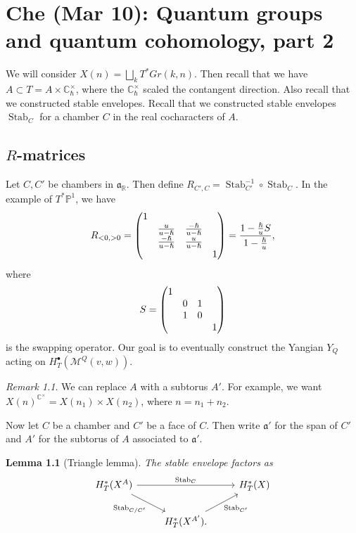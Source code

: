 \documentclass[leqno, openany]{memoir}
\newtheorem{lem}[thm]{Lemma}
\theoremstyle{definition}
\theoremstyle{remark}
\newtheorem{rmk}[thm]{Remark}
\theoremstyle{plain}
\theoremstyle{definition}
\theoremstyle{remark}
\newcommand{\R}{\mathbb{R}}
\newcommand{\C}{\mathbb{C}}
\renewcommand{\P}{\mathbb{P}}
\newcommand{\mc}[1]{\mathcal{#1}}
\newcommand{\mf}[1]{\mathfrak{#1}}
\newcommand{\on}[1]{\operatorname{#1}}
\begin{document}
\chapter{Che (Mar 10): Quantum groups and quantum cohomology, part 2}%

We will consider $X(n) = \bigsqcup_k T^* Gr(k, n)$. Then recall that we have $A \subset T = A \times \C_{\hslash}^{\times}$, where the $\C^{\times}_{\hslash}$ scaled the contangent direction. Also recall that we constructed stable envelopes. Recall that we constructed stable envelopes $\on{Stab}_C$ for a chamber $C$ in the real cocharacters of $A$.

\section{$R$-matrices}

Let $C, C'$ be chambers in $\mf{a}_{\R}$. Then define $R_{C', C} = \on{Stab}_{C'}^{-1} \circ \on{Stab}_C$. In the example of $T^* \P^1$, we have
\[ R_{<0, >0} = \mqty(1 \\ & \frac{u}{u-\hslash} & \frac{-\hslash}{u-\hslash} \\ & \frac{-\hslash}{u-\hslash} & \frac{u}{u-\hslash} \\ & & & 1) = \frac{1-\frac{\hslash}{u} S}{1-\frac{\hslash}{u}}, \]
where
\[ S = \mqty(1 \\ & 0 & 1 \\ & 1 & 0 \\ & & & 1) \]
is the swapping operator. Our goal is to eventually construct the Yangian $Y_Q$ acting on $H_T^{\bullet}(\mc{M}^Q(v, w))$.

\begin{rmk}
    We can replace $A$ with a subtorus $A'$. For example, we want $X(n)^{\C^{\times}} = X(n_1) \times X(n_2)$, where $n = n_1 + n_2$.
\end{rmk}


Now let $C$ be a chamber and $C'$ be a face of $C$. Then write $\mf{a}'$ for the span of $C'$ and $A'$ for the subtorus of $A$ associated to $\mf{a}'$.

\begin{lem}[Triangle lemma]
    The stable envelope factors as
    \begin{equation*}
    \begin{tikzcd}
        H_T^*(X^A) \ar{rr}{\on{Stab}_C} \ar[swap]{dr}{\on{Stab}_{C/C'}} & & H_T^*(X) \\
        & H_T^*(X^{A'}) \ar[swap]{ur}{\on{Stab}_{C'}}.
    \end{tikzcd}
    \end{equation*}
\end{lem}
\end{document}
